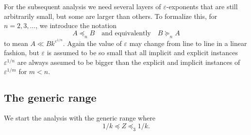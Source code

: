 \documentclass[11pt]{amsart}
\numberwithin{equation}{section}
\theoremstyle{plain}
\theoremstyle{definition}
\numberwithin{equation}{section}
\begin{document}
For the  subsequent analysis we need several  layers of $\varepsilon$-exponents that are still arbitrarily small, but some are larger than others.  To formalize this, for $n = 2, 3, \ldots$, we %
 introduce the notation 
 \begin{equation}\label{layered}
 A \preccurlyeq_{n} B \quad \text{and equivalently} \quad B \succcurlyeq _{n} A
 \end{equation}
to mean $A \ll  B k^{\varepsilon^{1/n}}$. %
 Again the value of $\varepsilon$   may change from line to line in a linear fashion, but $\varepsilon$ is assumed to be so small that 
all implicit and explicit instances $\varepsilon^{1/n}$    are always assumed to be bigger than the explicit and implicit instances of $\varepsilon^{1/m}$ for $m < n$. 
 
       
\subsection{The generic range}
      
We start the analysis with the generic range where $$1/k \preccurlyeq Z \preccurlyeq_{3} 1/k.$$ 
\end{document}
